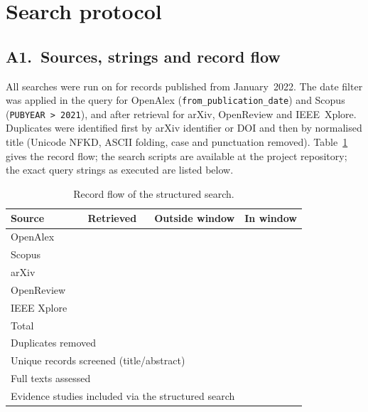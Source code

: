 
\section{Search protocol}
\label{app:search}

\subsection*{A1.\ Sources, strings and record flow}

All searches were run on \cutoffdate{} for records published from January~2022.
The date filter was applied in the query for OpenAlex (\texttt{from\_publication\_date})
and Scopus (\texttt{PUBYEAR > 2021}), and after retrieval for arXiv, OpenReview and
IEEE~Xplore. Duplicates were identified first by arXiv identifier or DOI and then by
normalised title (Unicode NFKD, ASCII folding, case and punctuation removed).
Table~\ref{tab:flow} gives the record flow; the search scripts are
available at the project repository; the exact query strings as executed are
listed below.

\begin{table}[h]
\caption{Record flow of the structured search.}
\label{tab:flow}
\small
\begin{tabular}{lrrr}
\toprule
Source & Retrieved & Outside window & In window \\
\midrule
OpenAlex    & \NretOpenAlex{}   & \NoutOpenAlex{}   & \NinOpenAlex{} \\
Scopus      & \NretScopus{}     & \NoutScopus{}     & \NinScopus{} \\
arXiv       & \NretarXiv{}      & \NoutarXiv{}      & \NinarXiv{} \\
OpenReview  & \NretOpenReview{} & \NoutOpenReview{} & \NinOpenReview{} \\
IEEE Xplore & \NretIEEE{}       & \NoutIEEE{}       & \NinIEEE{} \\
\midrule
Total       & \NrecTotal{}      & \Noutwindow{}     & \NinTotal{} \\
\multicolumn{3}{l}{Duplicates removed} & \Ndup{} \\
\multicolumn{3}{l}{Unique records screened (title/abstract)} & \Nscreened{} \\
\multicolumn{3}{l}{Full texts assessed} & \Nfulltext{} \\
\multicolumn{3}{l}{Evidence studies included via the structured search} & \NincludedS{} \\
\bottomrule
\end{tabular}
\end{table}

